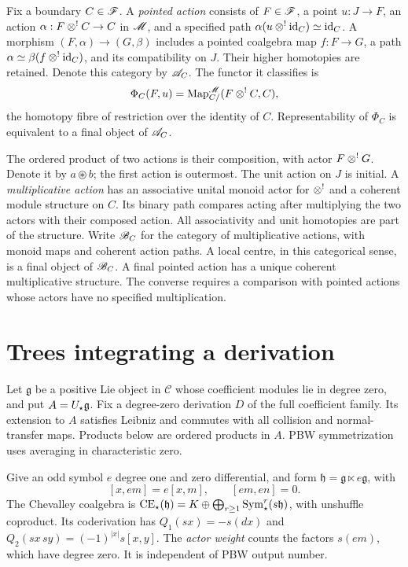 Fix a boundary $C\in\mathscr F$. A \emph{pointed action} consists of
$F\in\mathscr F$, a point $u:J\to F$, an action
$\alpha:F\mathbin{\otimes^!} C\to C$ in $\mathscr M$, and a specified path
$\alpha(u\mathbin{\otimes^!}\mathrm{id}_C)\simeq\mathrm{id}_C$.
A morphism $(F,\alpha)\to(G,\beta)$ includes a pointed coalgebra
map $f:F\to G$, a path
$\alpha\simeq\beta(f\mathbin{\otimes^!}\mathrm{id}_C)$, and its compatibility on $J$.
Their higher homotopies are retained. Denote this category by $\mathscr A_C$.
The functor it classifies is
\begin{equation}\label{eq:vol2-action-functor}
 \Phi_C(F,u)=\operatorname{Map}^{\mathscr M}_{C/}(F\mathbin{\otimes^!} C,C),
\end{equation}
the homotopy fibre of restriction over the identity of $C$.
Representability of $\Phi_C$ is equivalent to a final object of
$\mathscr A_C$.

The ordered product of two actions is their composition, with actor
$F\mathbin{\otimes^!} G$. Denote it by $a\circledast b$; the first action is
outermost. The unit action on $J$ is initial. A \emph{multiplicative
action} has an associative unital monoid actor for $\mathbin{\otimes^!}$ and a
coherent module structure on $C$. Its binary path compares acting
after multiplying the two actors with their composed action. All
associativity and unit homotopies are part of the structure.
Write $\mathscr B_C$ for the category of multiplicative actions, with monoid
maps and coherent action paths. A local centre, in this categorical
sense, is a final object of $\mathscr B_C$. A final pointed action has a
unique coherent multiplicative structure. The converse requires a
comparison with pointed actions whose actors have no specified
multiplication.

\section{Trees integrating a derivation}
\label{sec:vol2-action-profiles}

Let $\mathfrak g$ be a positive Lie object in $\mathscr C$ whose
coefficient modules lie in degree zero, and put $A=U_{\star}\mathfrak g$.
Fix a degree-zero derivation $D$ of the full coefficient family.
Its extension to $A$ satisfies Leibniz and commutes with all
collision and normal-transfer maps. Products below are ordered products in $A$.
PBW symmetrization uses averaging in characteristic zero.

Give an odd symbol $e$ degree one and zero differential, and form
$\mathfrak h=\mathfrak g\ltimes e\mathfrak g$, with
\[
 [x,em]=e[x,m],\qquad [em,en]=0.
\]
The Chevalley coalgebra is
$\operatorname{CE}_{\star}(\mathfrak h)=K\oplus\bigoplus_{r\geq1}
\operatorname{Sym}^r_\star(s\mathfrak h)$, with unshuffle coproduct.
Its coderivation has
$Q_1(sx)=-s(dx)$ and
$Q_2(sx\,sy)=(-1)^{|x|}s[x,y]$.
The \emph{actor weight} counts the factors $s(em)$, which have degree
zero. It is independent of PBW output number.

